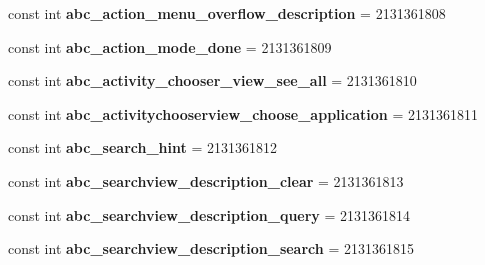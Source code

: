 \begin{DoxyCompactItemize}
\item 
\hypertarget{classClient_1_1Droid_1_1Resource_1_1String_aa19e8162c1c8e938ed92767436a7d829}{}const int {\bfseries abc\+\_\+action\+\_\+menu\+\_\+overflow\+\_\+description} = 2131361808\label{classClient_1_1Droid_1_1Resource_1_1String_aa19e8162c1c8e938ed92767436a7d829}

\item 
\hypertarget{classClient_1_1Droid_1_1Resource_1_1String_ac4f30d0f91b870537aa36fe90a8cd4d3}{}const int {\bfseries abc\+\_\+action\+\_\+mode\+\_\+done} = 2131361809\label{classClient_1_1Droid_1_1Resource_1_1String_ac4f30d0f91b870537aa36fe90a8cd4d3}

\item 
\hypertarget{classClient_1_1Droid_1_1Resource_1_1String_a0be4d78aafd4a492937bd80bb32af81d}{}const int {\bfseries abc\+\_\+activity\+\_\+chooser\+\_\+view\+\_\+see\+\_\+all} = 2131361810\label{classClient_1_1Droid_1_1Resource_1_1String_a0be4d78aafd4a492937bd80bb32af81d}

\item 
\hypertarget{classClient_1_1Droid_1_1Resource_1_1String_a151c1032a62cadba9bc3445a417c9b23}{}const int {\bfseries abc\+\_\+activitychooserview\+\_\+choose\+\_\+application} = 2131361811\label{classClient_1_1Droid_1_1Resource_1_1String_a151c1032a62cadba9bc3445a417c9b23}

\item 
\hypertarget{classClient_1_1Droid_1_1Resource_1_1String_a771d511dbd230ba36b5a72d7eea8ac96}{}const int {\bfseries abc\+\_\+search\+\_\+hint} = 2131361812\label{classClient_1_1Droid_1_1Resource_1_1String_a771d511dbd230ba36b5a72d7eea8ac96}

\item 
\hypertarget{classClient_1_1Droid_1_1Resource_1_1String_a15ec67e70108e18ced63783bb9c2f480}{}const int {\bfseries abc\+\_\+searchview\+\_\+description\+\_\+clear} = 2131361813\label{classClient_1_1Droid_1_1Resource_1_1String_a15ec67e70108e18ced63783bb9c2f480}

\item 
\hypertarget{classClient_1_1Droid_1_1Resource_1_1String_a9aa5aa50eb0924293a32e13e37b80fdf}{}const int {\bfseries abc\+\_\+searchview\+\_\+description\+\_\+query} = 2131361814\label{classClient_1_1Droid_1_1Resource_1_1String_a9aa5aa50eb0924293a32e13e37b80fdf}

\item 
\hypertarget{classClient_1_1Droid_1_1Resource_1_1String_a1cdd2a27c33e125a4ae49b6dbc97b6b6}{}const int {\bfseries abc\+\_\+searchview\+\_\+description\+\_\+search} = 2131361815\label{classClient_1_1Droid_1_1Resource_1_1String_a1cdd2a27c33e125a4ae49b6dbc97b6b6}


\end{DoxyCompactItemize}
